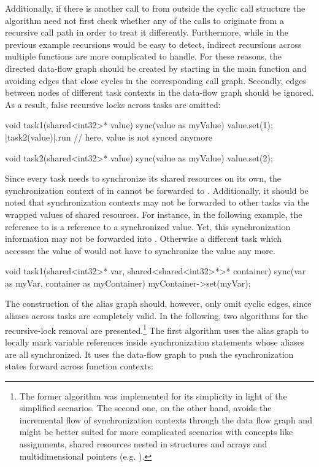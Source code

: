 Additionally, if there is another call to  from outside the cyclic call structure the algorithm need not first check whether any of the calls to  originate from a recursive call path in order to treat it differently. Furthermore, while in the previous example recursions would be easy to detect, indirect recursions across multiple functions are more complicated to handle. For these reasons, the directed data-flow graph should be created by starting in the main function and avoiding edges that close cycles in the corresponding call graph. Secondly, edges between nodes of different task contexts in the data-flow graph should be ignored. As a result, false recursive locks across tasks are omitted:
\begin{ccode}
void task1(shared<int32>* value) {
  sync(value as myValue) { value.set(1); 
    |task2(value)|.run                   // here, value is not synced anymore
  }
}

void task2(shared<int32>* value) {
  sync(value as myValue) { value.set(2); }
}
\end{ccode}
Since every task needs to synchronize its shared resources on its own, the synchronization context of  in  cannot be forwarded to . Additionally, it should be noted that synchronization contexts may not be forwarded to other tasks via the wrapped values of shared resources. For instance, in the following example, the reference to  is a reference to a synchronized value. Yet, this synchronization information may not be forwarded into . Otherwise a different task which accesses the value of  would not have to synchronize the value any more.
\begin{ccode}
void task1(shared<int32>* var, shared<shared<int32>*>* container) {
  sync(var as myVar, container as myContainer) {
    myContainer->set(myVar);
  }
}
\end{ccode}
The construction of the alias graph should, however, only omit cyclic edges, since aliases across tasks are completely valid. In the following, two algorithms for the recursive-lock removal are presented.\footnote{The former algorithm was implemented for its simplicity in light of the simplified scenarios. The second one, on the other hand, avoids the incremental flow of synchronization contexts through the data flow graph and might be better suited for more complicated scenarios with concepts like assignments, shared resources nested in structures and arrays and multidimensional pointers (e.g. ).} The first algorithm uses the alias graph to locally mark variable references inside synchronization statements whose aliases are all synchronized. It uses the data-flow graph to push the synchronization states forward across function contexts:

